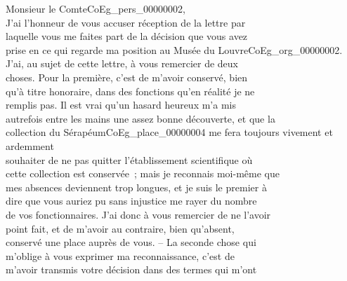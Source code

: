 \documentclass{book}
\begin{document}
\hspace{1cm} Monsieur le Comte\gls{CoEg_pers_00000002},\\

\indent J’ai l’honneur de vous accuser réception de la lettre par\\
laquelle vous me faites part de la décision que vous avez\\
prise en ce qui regarde ma position au Musée du Louvre\gls{CoEg_org_00000002}.\\
\indent J’ai, au sujet de cette lettre, à vous remercier de deux\\
choses. Pour la première, c’est de m’avoir conservé, bien\\
qu’à titre honoraire, dans des fonctions qu’en réalité je ne\\
remplis pas. Il est vrai qu’un hasard heureux m’a mis\\
autrefois entre les mains une assez bonne découverte, et que la\\
collection du Sérapéum\gls{CoEg_place_00000004} me fera toujours vivement et ardemment\\
souhaiter de ne pas quitter l’établissement scientifique où\\
cette collection est conservée~; mais je reconnais moi-même que\\
mes absences deviennent trop longues, et je suis le premier à\\
dire que vous auriez pu sans injustice me rayer du nombre\\
de vos fonctionnaires. J’ai donc à vous remercier de ne l’avoir\\
point fait, et de m’avoir au contraire, bien qu’absent,\\
conservé une place auprès de vous. – La seconde chose qui\\
m’oblige à vous exprimer ma reconnaissance, c’est de\\
m’avoir transmis votre décision dans des termes qui m’ont\\
\end{document}
